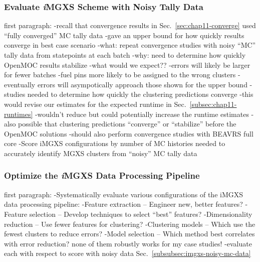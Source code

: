 \subsubsection{Evaluate \textit{i}MGXS Scheme with Noisy Tally Data}
\label{subsubsec:chap12-imgxs-noisy-mc-data}

first paragraph: 
-recall that convergence results in Sec.~\ref{sec:chap11-converge} used ``fully converged'' MC tally data
  -gave an upper bound for how quickly results converge in best case scenario
-what: repeat convergence studies with noisy ``MC'' tally data from statepoints at each batch
-why:  need to determine how quickly OpenMOC results stabilize 
-what would we expect??
  -errors will likely be larger for fewer batches
    -fuel pins more likely to be assigned to the wrong clusters
  -eventually errors will asympotically approach those shown for the upper bound
  -studies needed to determine how quickly the clustering predictions converge
-this would revise our estimates for the expected runtime in Sec.~\ref{subsec:chap11-runtimes}
  -wouldn't reduce but could potentially increase the runtime estimates
  -also possible that clustering predictions ``converge'' or ``stabilize'' before the OpenMOC solutions
-should also perform convergence studies with BEAVRS full core
-Score iMGXS configurations by number of MC histories needed to accurately identify MGXS clusters from ``noisy'' MC tally data

\subsubsection{Optimize the \textit{i}MGXS Data Processing Pipeline}
\label{subsubsec:chap12-optimize-imgxs}

first paragraph: 
-Systematically evaluate various configurations of the iMGXS data processing pipeline:
-Feature extraction – Engineer new, better features?
-Feature selection – Develop techniques to select “best” features?
-Dimensionality reduction – Use fewer features for clustering?
-Clustering models – Which use the fewest clusters to reduce errors?
-Model selection – Which method best correlates with error reduction? none of them robustly works for my case studies!
-evaluate each with respect to score with noisy data Sec.~\ref{subsubsec:imgxs-noisy-mc-data}

